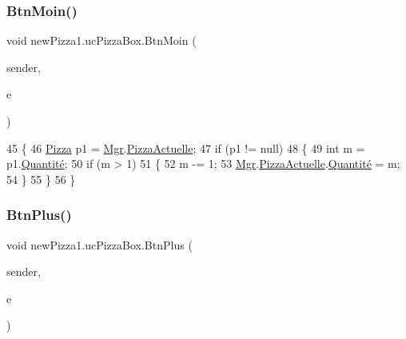 \subsubsection{\texorpdfstring{Btn\+Moin()}{BtnMoin()}}
{\footnotesize\ttfamily void new\+Pizza1.\+uc\+Pizza\+Box.\+Btn\+Moin (\begin{DoxyParamCaption}\item[{object}]{sender,  }\item[{Routed\+Event\+Args}]{e }\end{DoxyParamCaption})\hspace{0.3cm}{\ttfamily [inline]}}


\begin{DoxyCode}
45         \{
46             \hyperlink{classModele_1_1Pizza}{Pizza} p1 = \hyperlink{classnewPizza1_1_1ucPizzaBox_a236b692b1cd3447fc57d5ddfcbea57fc}{Mgr}.\hyperlink{classModele_1_1Manager_a7e69844aeeebbc80144850efc0d2b94c}{PizzaActuelle};
47             \textcolor{keywordflow}{if} (p1 != null)
48             \{
49                 \textcolor{keywordtype}{int} m = p1.\hyperlink{classModele_1_1Pizza_ae755ca79feb6f9a522aa18544c3f1310}{Quantité};
50                 \textcolor{keywordflow}{if} (m > 1)
51                 \{
52                     m -= 1;
53                     \hyperlink{classnewPizza1_1_1ucPizzaBox_a236b692b1cd3447fc57d5ddfcbea57fc}{Mgr}.\hyperlink{classModele_1_1Manager_a7e69844aeeebbc80144850efc0d2b94c}{PizzaActuelle}.\hyperlink{classModele_1_1Pizza_ae755ca79feb6f9a522aa18544c3f1310}{Quantité} = m;
54                 \}
55             \}
56         \}
\end{DoxyCode}
\mbox{\label{classnewPizza1_1_1ucPizzaBox_aace7edb7bdff4d02a75836f8a7e80221}} 
\subsubsection{\texorpdfstring{Btn\+Plus()}{BtnPlus()}}
{\footnotesize\ttfamily void new\+Pizza1.\+uc\+Pizza\+Box.\+Btn\+Plus (\begin{DoxyParamCaption}\item[{object}]{sender,  }\item[{Routed\+Event\+Args}]{e }\end{DoxyParamCaption})\hspace{0.3cm}{\ttfamily [inline]}}


